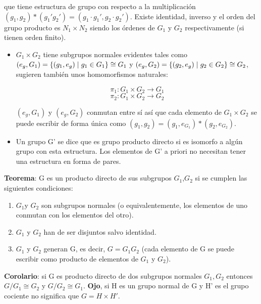 \documentclass{article}
\begin{document}
que tiene estructura de grupo con respecto a la multiplicación $(g_1,g_2)*(g_1'g_2')=(g_1\cdot g_1',g_2\cdot g_2')$. Existe identidad, inverso y el orden del grupo producto es $N_1\times N_2$ siendo los órdenes de $G_1$ y $G_2$ respectivamente (si tienen orden finito).

\begin{itemize}
        \item $G_1 \times G_2$ tiene subgrupos normales evidentes tales como $(e_g,G_1)=\lbrace (g_1,e_g) \hspace{0.1cm} | \hspace{0.1cm}g_1 \in G_1 \rbrace \cong G_1$ y $(e_g,G_2)=\lbrace (g_2,e_g) \hspace{0.1cm} | \hspace{0.1cm}g_2 \in G_2 \rbrace \cong G_2$, sugieren también unos homomorfismos naturales:
    
    $$\pi _1: G_1\times G_2 \to G_1$$
    $$\pi _2 : G_1\times G_2 \to G_2$$
    
    $(e_g,G_1)$ y $(e_g,G_2)$ conmutan entre sí así que cada elemento de $G_1 \times G_2$ se puede escribir de forma única como $(g_1,g_2)=(g_1,e_{G_1})*(g_2,e_{G_2})$.
    \item Un grupo G' se dice que es grupo producto directo si es isomorfo a algún grupo con esta estructura. Los elementos de G' a priori no necesitan tener una estructura en forma de pares.
    
\end{itemize}
 
 \textbf{Teorema}: G es un producto directo de sus subgrupos $G_1$,$G_2$ si se cumplen las siguientes condiciones:
 
 \begin{enumerate}
     \item $G_1$y $G_2$ son subgrupos normales (o equivalentemente, los elementos de uno conmutan con los elementos del otro).
     \item $G_1$ y $G_2$ han de ser disjuntos salvo identidad.
     \item $G_1$ y $G_2$ generan G, es decir, $G=G_1G_2$ (cada elemento de G se puede escribir como producto de elementos de $G_1$ y $G_2$).
 \end{enumerate}
 
 \textbf{Corolario}: si G es producto directo de dos subgrupos normales $G_1,G_2$ entonces $G/G_1 \cong G_2$ y $G/G_2 \cong G_1$. \textbf{Ojo}, si H es un grupo normal de G y H' es el grupo cociente no significa que $G=H\times H'$.
 
\end{document}
